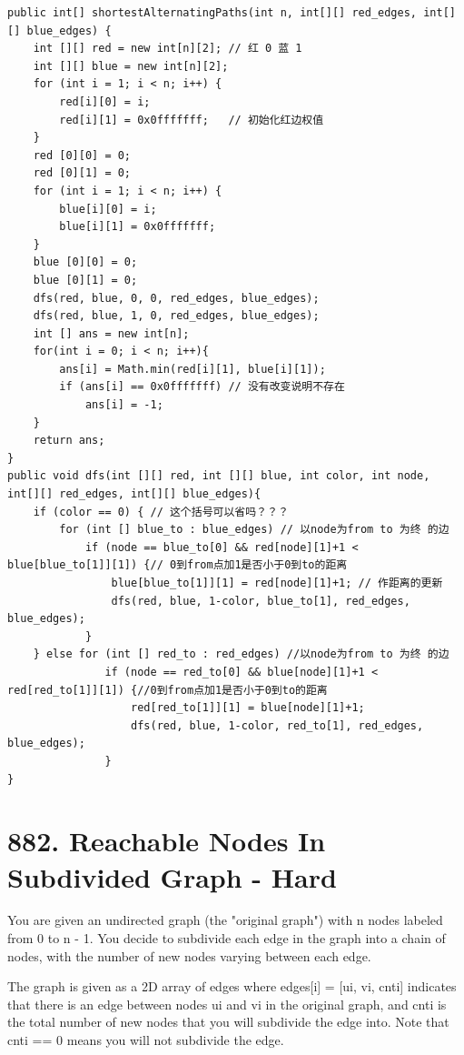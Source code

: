 \documentclass[9pt, b5paaper]{book}
\begin{document}
\begin{verbatim}
public int[] shortestAlternatingPaths(int n, int[][] red_edges, int[][] blue_edges) {
    int [][] red = new int[n][2]; // 红 0 蓝 1
    int [][] blue = new int[n][2];
    for (int i = 1; i < n; i++) {
        red[i][0] = i;
        red[i][1] = 0x0fffffff;   // 初始化红边权值
    }
    red [0][0] = 0;
    red [0][1] = 0;
    for (int i = 1; i < n; i++) {
        blue[i][0] = i;
        blue[i][1] = 0x0fffffff;
    }
    blue [0][0] = 0;
    blue [0][1] = 0;
    dfs(red, blue, 0, 0, red_edges, blue_edges);
    dfs(red, blue, 1, 0, red_edges, blue_edges);
    int [] ans = new int[n];
    for(int i = 0; i < n; i++){
        ans[i] = Math.min(red[i][1], blue[i][1]);
        if (ans[i] == 0x0fffffff) // 没有改变说明不存在
            ans[i] = -1;
    }
    return ans;
}
public void dfs(int [][] red, int [][] blue, int color, int node, int[][] red_edges, int[][] blue_edges){
    if (color == 0) { // 这个括号可以省吗？？？
        for (int [] blue_to : blue_edges) // 以node为from to 为终 的边
            if (node == blue_to[0] && red[node][1]+1 < blue[blue_to[1]][1]) {// 0到from点加1是否小于0到to的距离
                blue[blue_to[1]][1] = red[node][1]+1; // 作距离的更新
                dfs(red, blue, 1-color, blue_to[1], red_edges, blue_edges);
            }
    } else for (int [] red_to : red_edges) //以node为from to 为终 的边
               if (node == red_to[0] && blue[node][1]+1 < red[red_to[1]][1]) {//0到from点加1是否小于0到to的距离
                   red[red_to[1]][1] = blue[node][1]+1;
                   dfs(red, blue, 1-color, red_to[1], red_edges, blue_edges);
               }
}
\end{verbatim}

\section{882. Reachable Nodes In Subdivided Graph - Hard}
\label{sec-18-4}
You are given an undirected graph (the "original graph") with n nodes labeled from 0 to n - 1. You decide to subdivide each edge in the graph into a chain of nodes, with the number of new nodes varying between each edge.

The graph is given as a 2D array of edges where edges[i] = [ui, vi, cnti] indicates that there is an edge between nodes ui and vi in the original graph, and cnti is the total number of new nodes that you will subdivide the edge into. Note that cnti == 0 means you will not subdivide the edge.
\end{document}
